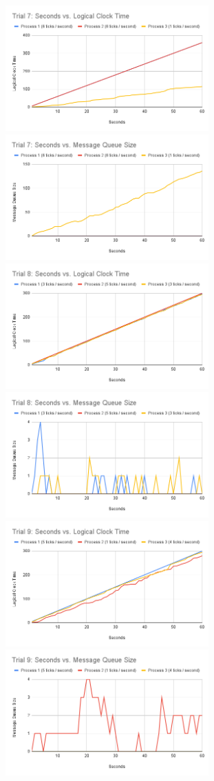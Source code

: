 \documentclass[
	a4paper, %
	10pt, %
	unnumberedsections, %
	twoside, %
]{LTJournalArticle}
\begin{document}
\includegraphics[width=7.8cm]{assets/t7_clock.png}
\includegraphics[width=7.8cm]{assets/t7_size.png}
\includegraphics[width=7.8cm]{assets/t8_clock.png}
\includegraphics[width=7.8cm]{assets/t8_size.png}
\includegraphics[width=7.8cm]{assets/t9_clock.png}
\includegraphics[width=7.8cm]{assets/t9_size.png}
\end{document}

